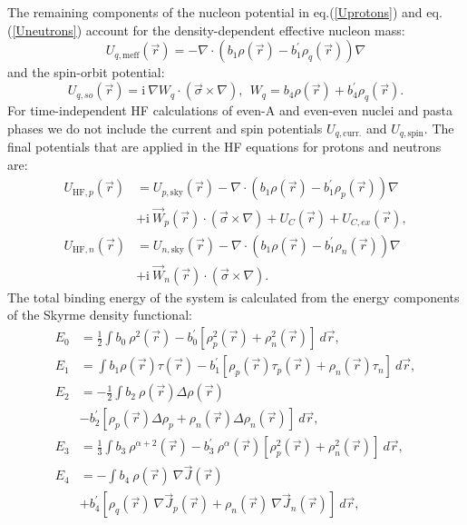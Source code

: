 \documentclass[3p]{elsarticle}
\begin{document}
The remaining components of the nucleon potential in eq.(\ref{Uprotons}) and eq.(\ref{Uneutrons}) account for the density-dependent effective nucleon mass:
\begin{equation}
U_{q,\mathrm{meff}} (\vec{r}) =  - \nabla \cdot \left( b_1 \rho (\vec{r}) - b^{\prime}_1 \rho_q (\vec{r}) \right) \nabla
\label{Umeff}
\end{equation}
and the spin-orbit potential:
\begin{equation} 
U_{q,so} (\vec{r}) = \mathrm{i} \: \nabla W_q \cdot \left( \vec{\sigma} \times \nabla \right), \:\: W_q = b_4 \rho (\vec{r}) + b_4^\prime \rho_q (\vec{r}).
\label{Uso}
\end{equation}
For time-independent HF calculations of even-A and even-even nuclei and pasta phases we do not include the current and spin potentials $U_{q, \mathrm{curr.}}$ and $U_{q, \mathrm{spin}}$. The final potentials that are applied in the HF equations for protons and neutrons are:
\begin{align}
U_{\mathrm{HF},p} (\vec{r}) &=  U_{p,\mathrm{sky}}(\vec{r}) - \nabla \cdot \left( b_1 \rho (\vec{r}) - b^{\prime}_1 \rho_p (\vec{r}) \right) \nabla \nonumber\\
& + \mathrm{i} \: \vec{W}_p (\vec{r}) \cdot (\vec{\sigma} \times \nabla )+ U_{C}(\vec{r}) + U_{C,ex}(\vec{r}) , \\
U_{\mathrm{HF},n} (\vec{r}) &=  U_{n,\mathrm{sky}}(\vec{r}) - \nabla \cdot \left( b_1 \rho (\vec{r}) - b^{\prime}_1 \rho_n (\vec{r}) \right) \nabla \nonumber\\
&+ \mathrm{i} \: \vec{W}_n (\vec{r}) \cdot (\vec{\sigma} \times \nabla ).
\end{align}
The total binding energy of the system is calculated from the energy components of the Skyrme density functional: 
\begin{align}
E_0 &= \frac{1}{2} \int  b_0 \: \rho^2 (\vec{r}) - b^{\prime}_0 \left[ \rho_p^2 (\vec{r}) + \rho_n^2 (\vec{r}) \right] \: d \vec{r} , \\ 
E_1 &=  \int  b_1 \rho (\vec{r}) \tau (\vec{r}) - b^{\prime}_1 \left[\rho_p (\vec{r}) \tau_p (\vec{r}) + \rho_n (\vec{r}) \tau_n \right] \: d \vec{r} , 
\label{energy01}\\
E_2 &=  - \frac{1}{2} \int  b_2  \: \rho (\vec{r}) \Delta \rho (\vec{r}) \nonumber\\
& - b^{\prime}_2 \left[ \rho_p (\vec{r}) \Delta \rho_p + \rho_n (\vec{r}) \Delta \rho_n (\vec{r}) \right]   \: d \vec{r} , \\
E_3 &= \frac{1}{3} \int b_3 \: \rho^{\alpha + 2} (\vec{r}) - b^{\prime}_3 \: \rho^{\alpha} (\vec{r}) \left[ \rho_p^2 (\vec{r}) + \rho_n^2 (\vec{r}) \right]  \: d \vec{r} , 
\label{energy23}\\
E_4 &= - \int  b_4 \: \rho (\vec{r}) \: \nabla \vec{J} (\vec{r}) \nonumber\\
&+ b^{\prime}_4 \left[ \rho_q (\vec{r})  \: \nabla \vec{J}_p (\vec{r}) +  \rho_n (\vec{r})  \: \nabla \vec{J}_n (\vec{r}) \right] \:  d \vec{r} , 
\label{energy4}
\end{align}
\end{document}
